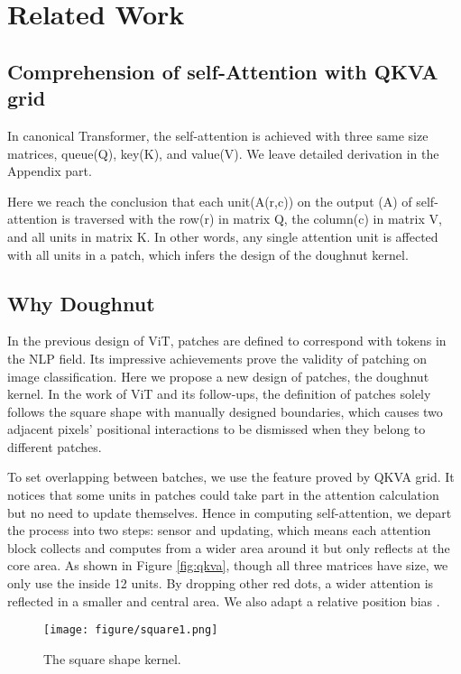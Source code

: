 \documentclass{article}
\theoremstyle{plain}
\theoremstyle{definition}
\theoremstyle{remark}
\begin{document}
\section{Related Work}
\subsection{Comprehension of self-Attention with QKVA grid}
In canonical Transformer, the self-attention is achieved with three same size matrices, queue(Q), key(K), and value(V). We leave detailed derivation in the Appendix part.

Here we reach the conclusion that each unit(A(r,c)) on the output (A) of self-attention is traversed with the row(r) in matrix Q, the column(c) in matrix V, and all units in matrix K. In other words, any single attention unit is affected with all units in a patch, which infers the design of the doughnut kernel.

\subsection{Why Doughnut}
In the previous design of ViT, patches are defined to correspond with tokens in the NLP field. Its impressive achievements prove the validity of patching on image classification. Here we propose a new design of patches, the doughnut kernel. In the work of ViT and its follow-ups, the definition of patches solely follows the square shape with manually designed boundaries, which causes two adjacent pixels' positional interactions to be dismissed when they belong to different patches. 

To set overlapping between batches, we use the feature proved by QKVA grid. It notices that some units in patches could take part in the attention calculation but no need to update themselves. Hence in computing self-attention, we depart the process into two steps: sensor and updating, which means each attention block collects and computes from a wider area around it but only reflects at the core area. 
As shown in Figure \ref{fig:qkva}, though all three matrices have  size, we only use the inside 12 units. By dropping other red dots, a wider attention is reflected in a smaller and central area. We also adapt a relative position bias  \cite{liu2021swin}.

\begin{figure}[h]
\centering
    \texttt{[image: figure/square1.png]}
\caption{The square shape kernel.}
\label{fig:square}
\end{figure}
\end{document}
